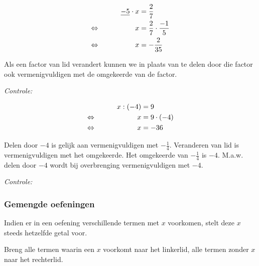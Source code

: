 \documentclass[12pt]{article}
\newcommand{\tikzmark}[1]{\tikz[overlay,remember picture] \node (#1) {};}
\begin{document}
\begin{voorbeeld}
\begin{alignat*}{2}
     && \underline{-5}_{\tikzmark{a}}\cdot x &= \tikzmark{b}\dfrac{2}{7}\\
\LRA &&   x &= \dfrac{2}{7}\cdot\dfrac{-1}{5}\\
\LRA &&   x &= -\dfrac{2}{35}
\end{alignat*}


Als een factor van lid verandert kunnen we in plaats van te delen door die factor ook vermenigvuldigen met de omgekeerde van de factor.

{\em Controle: } 
\end{voorbeeld}

\begin{voorbeeld}

\begin{minipage}{0.5\textwidth}
\begin{alignat*}{2}
    && x : (-4) &= 9\\
\Leftrightarrow\mkern40mu&& x &= 9 \cdot(-4)\\
\Leftrightarrow\mkern40mu&&x &= -36
\end{alignat*}
\end{minipage}
\begin{minipage}[t]{0.5\textwidth}
Delen door $-4$ is gelijk aan vermenigvuldigen met $-\frac{1}{4}$. Veranderen van lid is vermenigvuldigen met het omgekeerde. Het omgekeerde van $-\frac{1}{4}$ is $-4$. M.a.w. delen door $-4$ wordt bij overbrenging vermenigvuldigen met $-4$.
\end{minipage}
\end{voorbeeld}
{\em Controle: }\\

\subsubsection{Gemengde oefeningen}

Indien er in een oefening verschillende termen met $x$ voorkomen, stelt deze $x$ steeds hetzelfde getal voor.

Breng alle termen waarin een $x$ voorkomt naar het linkerlid, alle termen zonder $x$ naar het rechterlid.
\end{document}
